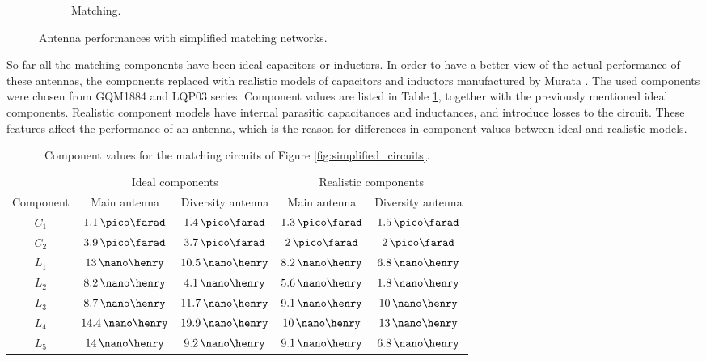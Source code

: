 \begin{figure}[H]
\begin{subfigure}[b]{0.49\textwidth}
        \caption{Matching.}
        \label{fig:div_ideal_match}
    \end{subfigure}
    \caption{Antenna performances with simplified matching networks.}
    \label{fig:div_eff}
\end{figure}

So far all the matching components have been ideal capacitors or inductors. In order to have a better view of the actual performance of these antennas, the components replaced with realistic models of capacitors and inductors manufactured by Murata \cite{murata}. The used components were chosen from GQM1884 \cite{murata_c} and LQP03 \cite{murata_l} series. Component values are listed in Table \ref{tab:match}, together with the previously mentioned ideal components. Realistic component models have internal parasitic capacitances and inductances, and introduce losses to the circuit. These features affect the performance of an antenna, which is the reason for differences in component values between ideal and realistic models.
\begin{table}[H]
    \centering
    \caption{Component values for the matching circuits of Figure \ref{fig:simplified_circuits}.}
    \label{tab:match}
    \begin{tabular}{|c|c|c|c|c|}
        \hline
         & \multicolumn{2}{|c|}{Ideal components} & \multicolumn{2}{|c|}{Realistic components} \\
         \cline{2-5}
         Component & Main antenna & Diversity antenna & Main antenna & Diversity antenna\\
         \hline
         $C_1$ & $1.1\,\pico\farad$ & $1.4\,\pico\farad$ & $1.3\,\pico\farad$ & $1.5\,\pico\farad$\\
         \hline
         $C_2$ & $3.9\,\pico\farad$ & $3.7\,\pico\farad$ & $2\,\pico\farad$ & $2\,\pico\farad$\\
         \hline
         $L_1$ & $13\,\nano\henry$ & $10.5\,\nano\henry$ & $8.2\,\nano\henry$ & $6.8\,\nano\henry$\\
         \hline
         $L_2$ & $8.2\,\nano\henry$ & $4.1\,\nano\henry$ & $5.6\,\nano\henry$ & $1.8\,\nano\henry$\\
         \hline
         $L_3$ & $8.7\,\nano\henry$ & $11.7\,\nano\henry$ & $9.1\,\nano\henry$ & $10\,\nano\henry$\\
         \hline
         $L_4$ & $14.4\,\nano\henry$ & $19.9\,\nano\henry$ & $10\,\nano\henry$ & $13\,\nano\henry$\\
         \hline
         $L_5$ & $14\,\nano\henry$ & $9.2\,\nano\henry$ & $9.1\,\nano\henry$ & $6.8\,\nano\henry$\\
         \hline
    \end{tabular}
\end{table}

